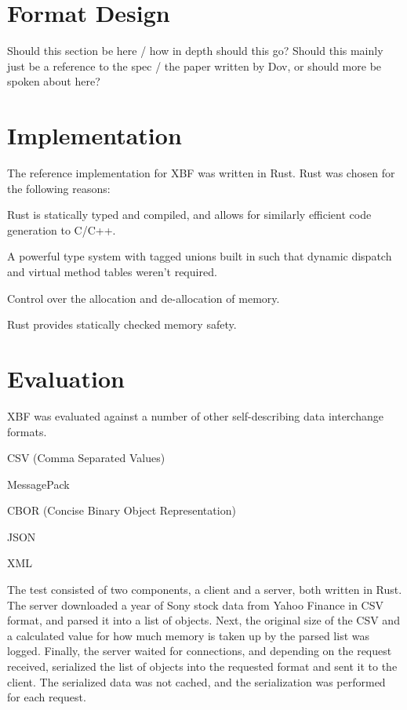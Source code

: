 \documentclass[conference]{IEEEtran}
\begin{document}
\section{Format Design}

Should this section be here / how in depth should this go? Should this mainly just be a reference to the spec / the paper written by Dov, or should more be spoken about here?

\section{Implementation}

The reference implementation for XBF\cite{xbf_impl} was written in Rust. Rust was chosen for the following reasons:
\begin{IEEEitemize}
	\item Rust is statically typed and compiled, and allows for similarly efficient code generation to C/C++.
	\item A powerful type system with tagged unions built in such that dynamic dispatch and virtual method tables weren't required.
	\item Control over the allocation and de-allocation of memory.
	\item Rust provides statically checked memory safety.
\end{IEEEitemize}

\section{Evaluation}

XBF was evaluated against a number of other self-describing data interchange formats.

\begin{IEEEitemize}
	\item CSV (Comma Separated Values)\cite{csv_spec}\cite{csv_parser}
	\item MessagePack\cite{msgpack_spec}\cite{msgpack_parser}
	\item CBOR (Concise Binary Object Representation)\cite{cbor_spec}\cite{cbor_parser}
	\item JSON\cite{json_parser}
	\item XML\cite{xml_parser}
\end{IEEEitemize}

The test consisted of two components, a client and a server, both written in Rust. The server downloaded a year of Sony stock data from Yahoo Finance\cite{sony_stock_data} in CSV format, and parsed it into a list of objects. Next, the original size of the CSV and a calculated value for how much memory is taken up by the parsed list was logged. Finally, the server waited for connections, and depending on the request received, serialized the list of objects into the requested format and sent it to the client. The serialized data was not cached, and the serialization was performed for each request.
\end{document}

